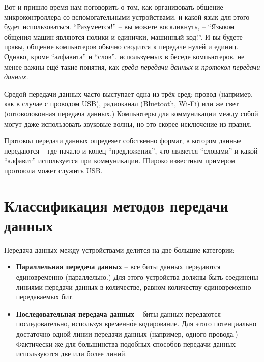 \documentclass[../sparc.tex]{subfiles}
\begin{document}
Вот и пришло время нам поговорить о том, как организовать общение
микроконтроллера со вспомогательными устройствами, и какой язык для этого будет
использоваться.  ``Разумеется!'' -- вы можете воскликнуть, -- ``Языком общения
машин являются нолики и единички, машинный код!''.  И вы будете правы, общение
компьютеров обычно сводится к передаче нулей и единиц.  Однако, кроме
``алфавита'' и ``слов'', используемых в беседе компьютеров, не менее важны ещё
такие понятия, как \emph{среда передачи данных} и \emph{протокол передачи
данных}.

Средой передачи данных часто выступает одна из трёх сред: провод (например, как
в случае с проводом USB), радиоканал (Bluetooth, Wi-Fi) или же свет
(оптоволоконная передача данных.)  Компьютеры для коммуникации между собой могут
даже использовать звуковые волны, но это скорее исключение из правил.

Протокол передачи данных опредеяет собственно формат, в котором данные
передаются -- где начало и конец ``предложения'', что является ``словами'' и
какой ``алфавит'' используется при коммуникации.  Широко известным примером
протокола может служить USB.

\section{Классификация методов передачи данных}


Передача данных между устройствами делится на две большие категории:

\begin{itemize}
\item \textbf{Параллельная передача данных} -- все биты данных передаются
  единовременно (параллельно.)  Для этого устройства должны быть соединены
  линиями передачи данных в количестве, равном количеству единовременно
  передаваемых бит.
\item \textbf{Последовательная передача данных} -- биты данных передаются
  последовательно, используя временн\'{о}е кодирование.  Для этого потенциально
  достаточно одной линии передачи данных (например, одного провода.) Фактически
  же для большинства подобных способов передачи данных используются две или
  более линий.
\end{itemize}
\end{document}
